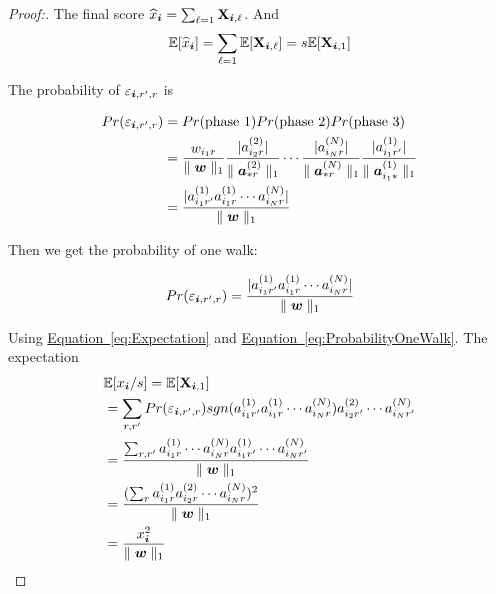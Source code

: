 \documentclass[letterpaper]{article}
\newcommand{\Sca}[3]{{#1}^{(#2)}_{i_#2#3}}%
\newcommand{\V}[1]{{\bm{{\MakeLowercase{#1}}}}}
\newcommand{\VnC}[3]{\V{#1}^{(#2)}_{#3}}
\newcommand{\M}[1]{{\bm{\mathbf{\MakeUppercase{#1}}}}}
\newcommand{\norm}[2]{\parallel#1\parallel_{#2}}
\newcommand{\Eqn}[1] {\hyperref[eq:#1]  {Equation~\ref*{eq:#1}}}
\begin{document}
\begin{proof}[Proof:]
The final score $\widehat{x}_{\V{i}} = \sum_{\ell=1}\M{X}_{\V{i},\ell}$. And
\begin{equation}\label{eq:Expectation}
\mathbb{E}[\widehat{x}_{\V{i}}] = \sum_{\ell=1}\mathbb{E}[\M{X}_{\V{i},\ell}]=s\mathbb{E}[\M{X}_{\V{i},1}]
\end{equation}

The probability of $\varepsilon_{\V{i},r',r}$ is

\begin{align*}
Pr(\varepsilon_{\V{i},r',r})
& = Pr({\rm phase\ 1})Pr({\rm phase\ 2})Pr({\rm phase\ 3})\\
&=\frac{w_{i_1r}}{\norm{\V{W}}{1}}
  \frac{|\Sca{a}{2}{r}|}{\norm{{\VnC{a}{2}{*r}}}{1}}\cdots
  \frac{|\Sca{a}{N}{r}|}{\norm{{\VnC{a}{N}{*r}}}{1}}
  \frac{|\Sca{a}{1}{r'}|}{\norm{{\VnC{a}{1}{i_1*}}}{1}}\\
&=\frac{    |\Sca{a}{1}{r'}\Sca{a}{1}{r}\cdots\Sca{a}{N}{r}|    }{\norm{\V{W}}{1}}
\end{align*}

Then we get the probability of one walk:

\begin{equation}\label{eq:ProbabilityOneWalk}
Pr(\varepsilon_{\V{i},r',r})=\frac{|\Sca{a}{1}{r'}\Sca{a}{1}{r}\cdots\Sca{a}{N}{r}|}{\norm{\V{W}}{1}}
\end{equation}

Using \Eqn{Expectation} and \Eqn{ProbabilityOneWalk}. The expectation
\begin{align*}
&\mathbb{E}[x_{\V{i}}/s] = \mathbb{E}[\M{X}_{\V{i},1}]\\
&=\sum_{r,r'} Pr(\varepsilon_{\V{i},r',r}) sgn(\Sca{a}{1}{r'}\Sca{a}{1}{r}\cdots\Sca{a}{N}{r})
\Sca{a}{2}{r'}\cdots\Sca{a}{N}{r'}\\
&=\frac{\sum_{r,r'} \Sca{a}{1}{r}\cdots\Sca{a}{N}{r}\Sca{a}{1}{r'}\cdots\Sca{a}{N}{r'}}{\norm{\V{W}}{1}}\\
&=\frac{(\sum_{r}\Sca{a}{1}{r}\Sca{a}{2}{r}\cdots\Sca{a}{N}{r})^2}{\norm{\V{W}}{1}}\\
&=\frac{x_{\V{i}}^2}{\norm{\V{W}}{1}}
\end{align*}
\end{proof}
\end{document}

